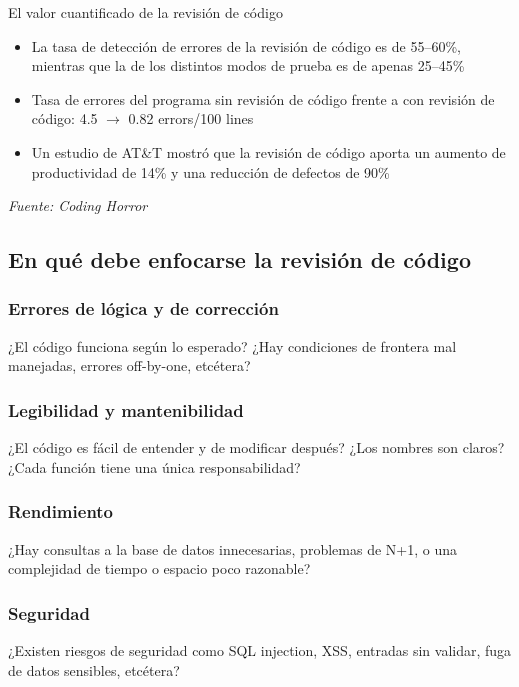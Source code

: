 \documentclass[a4paper]{article}
\begin{document}
\begin{importantbox}{El valor cuantificado de la revisión de código}
\begin{itemize}
    \item La tasa de detección de errores de la revisión de código es de 55--60\%, mientras que la de los distintos modos de prueba es de apenas 25--45\%
    \item Tasa de errores del programa sin revisión de código frente a con revisión de código: 4.5 $\rightarrow$ 0.82 errors/100 lines
    \item Un estudio de AT\&T mostró que la revisión de código aporta un aumento de productividad de 14\% y una reducción de defectos de 90\%
\end{itemize}
\textit{Fuente: Coding Horror}
\end{importantbox}

\subsection{En qué debe enfocarse la revisión de código}

\subsubsection{Errores de lógica y de corrección}

¿El código funciona según lo esperado? ¿Hay condiciones de frontera mal manejadas, errores off-by-one, etcétera?

\subsubsection{Legibilidad y mantenibilidad}

¿El código es fácil de entender y de modificar después? ¿Los nombres son claros? ¿Cada función tiene una única responsabilidad?

\subsubsection{Rendimiento}

¿Hay consultas a la base de datos innecesarias, problemas de N+1, o una complejidad de tiempo o espacio poco razonable?

\subsubsection{Seguridad}

¿Existen riesgos de seguridad como SQL injection, XSS, entradas sin validar, fuga de datos sensibles, etcétera?
\end{document}

